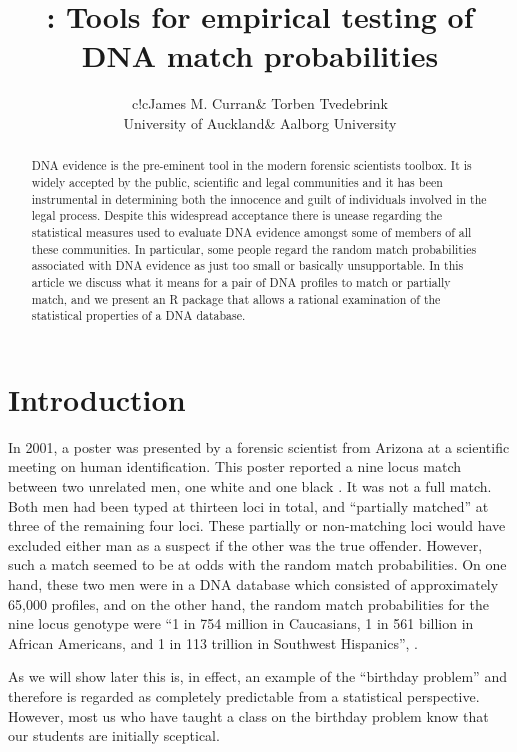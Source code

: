 \documentclass[a4paper,11pt]{article}
\author{\begin{tabular}{c!{\hspace{10mm}}c}James M. Curran& Torben Tvedebrink \\University of
  Auckland& Aalborg University\end{tabular}}
\title{\pkg{DNAtools} : Tools for empirical testing of DNA match probabilities}
\date{}
\newcommand{\proglang}[1]{\textsf{#1}}
\begin{document}



\maketitle

\begin{abstract}
  DNA evidence is the pre-eminent tool in the modern forensic scientists
toolbox. It is widely accepted by the public, scientific and legal
communities and it has been instrumental in determining both the innocence
and guilt of individuals involved in the legal process. Despite this
widespread acceptance there
is unease regarding the statistical measures used to evaluate DNA
evidence amongst some of members of all these communities. In particular,
some people regard the random match probabilities associated with
DNA evidence as just too small or basically unsupportable. In this
article we discuss what it means for a pair of DNA profiles to match
or partially match, and we  present an \proglang{R} package that allows a rational
examination of the statistical properties of a DNA database.
\end{abstract}

\section[Introduction]{Introduction}
\label{sec:introduction}
In 2001, a poster was presented by a forensic scientist from Arizona
\citep{troyer2001} at a scientific meeting on human
identification. This poster reported a nine locus match between two
unrelated men, one white and one black \citep{kaye2009}.  It was not a
full match. Both men had been typed at thirteen loci in total, and
``partially matched'' at three of the remaining four loci. These
partially or non-matching loci would have excluded either man as a
suspect if the other was the true offender. However, such a match
seemed to be at odds with the random match probabilities. On one hand,
these two men were in a DNA database which consisted of approximately
65,000 profiles, and on the other hand, the random match probabilities
for the nine locus genotype were ``1 in 754 million in Caucasians, 1
in 561 billion in African Americans, and 1 in 113 trillion in
Southwest Hispanics'', \citet{troyer2001}.

As we will show later this is, in effect, an example of the ``birthday
problem'' and therefore is regarded as completely predictable from a
statistical perspective. However, most us who have taught a class on
the birthday problem know that our students are initially sceptical. 
\end{document}
